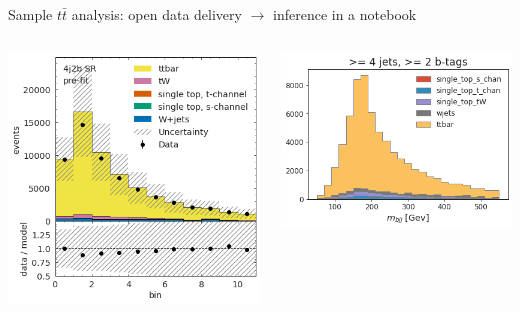 \documentclass[aspectratio=169]{beamer}
\begin{document}
\begin{frame}{Sample $t\bar{t}$ analysis: open data delivery $\to$ inference in a notebook}
\begin{columns}
\begin{columns}
\vfill
\includegraphics[width=\linewidth]{PLOTS/gac-ttbar-plot-6.png}

\includegraphics[width=\linewidth]{PLOTS/gac-ttbar-plot-1.png}


\end{columns}
\end{columns}
\end{frame}
\end{document}

